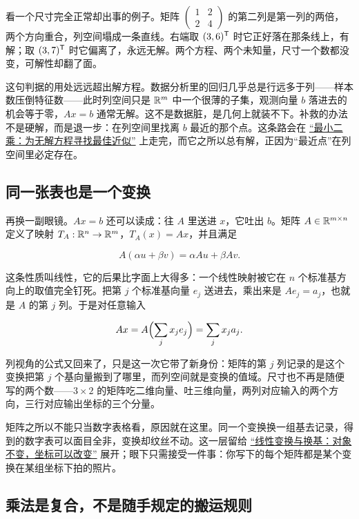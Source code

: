 看一个尺寸完全正常却出事的例子。矩阵 \(\begin{pmatrix}1&2\\2&4\end{pmatrix}\) 的第二列是第一列的两倍，两个方向重合，列空间塌成一条直线。右端取 \((3,6)^{\mathsf{T}}\) 时它正好落在那条线上，有解；取 \((3,7)^{\mathsf{T}}\) 时它偏离了，永远无解。两个方程、两个未知量，尺寸一个数都没变，可解性却翻了面。

\begin{remark}
这句判据的用处远远超出解方程。数据分析里的回归几乎总是行远多于列——样本数压倒特征数——此时列空间只是 \(\mathbb{R}^m\) 中一个很薄的子集，观测向量 \(b\) 落进去的机会等于零，\(Ax=b\) 通常无解。这不是数据脏，是几何上就装不下。补救的办法不是硬解，而是退一步：在列空间里找离 \(b\) 最近的那个点。这条路会在 \hyperref[sec:03-Linear-Algebra/03-Orthogonality/03]{``最小二乘：为无解方程寻找最佳近似''} 上走完，而它之所以总有解，正因为``最近点''在列空间里必定存在。
\end{remark}

\subsection{同一张表也是一个变换}

再换一副眼镜。\(Ax=b\) 还可以读成：往 \(A\) 里送进 \(x\)，它吐出 \(b\)。矩阵 \(A\in\mathbb{R}^{m\times n}\) 定义了映射 \(T_A:\mathbb{R}^n\to\mathbb{R}^m\)，\(T_A(x)=Ax\)，并且满足

\[
A(\alpha u+\beta v)=\alpha Au+\beta Av.
\]

这条性质叫线性，它的后果比字面上大得多：一个线性映射被它在 \(n\) 个标准基方向上的取值完全钉死。把第 \(j\) 个标准基向量 \(e_j\) 送进去，乘出来是 \(Ae_j=a_j\)，也就是 \(A\) 的第 \(j\) 列。于是对任意输入

\[
Ax=A\Bigl(\sum_{j} x_je_j\Bigr)=\sum_{j} x_ja_j .
\]

列视角的公式又回来了，只是这一次它带了新身份：矩阵的第 \(j\) 列记录的是这个变换把第 \(j\) 个基向量搬到了哪里，而列空间就是变换的值域。尺寸也不再是随便写的两个数——\(3\times2\) 的矩阵吃二维向量、吐三维向量，两列对应输入的两个方向，三行对应输出坐标的三个分量。

矩阵之所以不能只当数字表格看，原因就在这里。同一个变换换一组基去记录，得到的数字表可以面目全非，变换却纹丝不动。这一层留给 \hyperref[sec:03-Linear-Algebra/02-Vector-Spaces/04]{``线性变换与换基：对象不变，坐标可以改变''} 展开；眼下只需接受一件事：你写下的每个矩阵都是某个变换在某组坐标下拍的照片。

\subsection{乘法是复合，不是随手规定的搬运规则}

